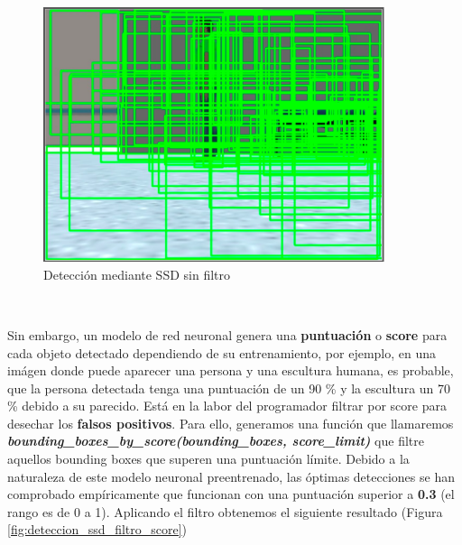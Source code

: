 \begin{figure} [H]
  \begin{center}
    \includegraphics[width=10cm]{imagenes/deteccion-ssd-sin-filtro.png}
  \end{center}
  \caption[Detección mediante SSD sin filtro]{Detección mediante SSD sin filtro}
  \label{fig:deteccion_ssd_sin_filtro}
\end{figure}\

Sin embargo, un modelo de red neuronal genera una \textbf{puntuación} o \textbf{score} para cada objeto detectado dependiendo de su entrenamiento, por ejemplo, en una imágen donde puede aparecer una persona y una escultura humana, es probable, que la persona detectada tenga una puntuación de un 90 \% y la escultura un 70 \% debido a su parecido. Está en la labor del programador filtrar por score para desechar los \textbf{falsos positivos}. Para ello, generamos una función que llamaremos \textbf{\textit{bounding\_boxes\_by\_score(bounding\_boxes, score\_limit)}} que filtre aquellos bounding boxes que superen una puntuación límite. Debido a la naturaleza de este modelo neuronal preentrenado, las óptimas detecciones se han comprobado empíricamente que funcionan con una puntuación superior a \textbf{0.3} (el rango es de 0 a 1). Aplicando el filtro obtenemos el siguiente resultado (Figura \ref{fig:deteccion_ssd_filtro_score})\\

